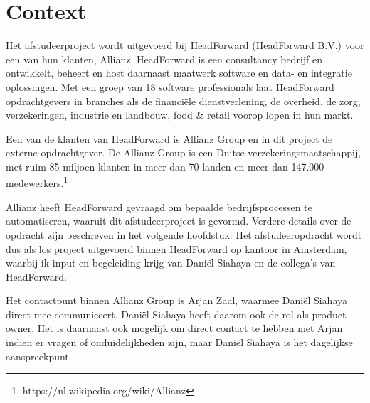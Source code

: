 \chapter{Context}\label{chap:context}
Het afstudeerproject wordt uitgevoerd bij HeadForward (HeadForward B.V.) voor een van hun klanten, Allianz. HeadForward is een consultancy bedrijf en ontwikkelt, beheert en host daarnaast maatwerk software en data- en integratie oplossingen. Met een groep van 18 software professionals laat HeadForward opdrachtgevers in branches als de financiële dienstverlening, de overheid, de zorg, verzekeringen, industrie en landbouw, food \& retail voorop lopen in hun markt.\par

Een van de klanten van HeadForward is Allianz Group en in dit project de externe opdrachtgever. De Allianz Group is een Duitse verzekeringsmaatschappij, met ruim 85 miljoen klanten in meer dan 70 landen en meer dan 147.000 medewerkers.\footnote{https://nl.wikipedia.org/wiki/Allianz} \par

Allianz heeft HeadForward gevraagd om bepaalde bedrijfsprocessen te automatiseren, waaruit dit afstudeerproject is gevormd. Verdere details over de opdracht zijn beschreven in het volgende hoofdstuk. Het afstudeeropdracht wordt dus als los project uitgevoerd binnen HeadForward op kantoor in Amsterdam, waarbij ik input en begeleiding krijg van Dani\"el Siahaya en de collega's van HeadForward.\par

Het contactpunt binnen Allianz Group is Arjan Zaal, waarmee Dani\"el Siahaya direct mee communiceert. Dani\"el Siahaya heeft daarom ook de rol als product owner. Het is daarnaast ook mogelijk om direct contact te hebben met Arjan indien er vragen of onduidelijkheden zijn, maar Dani\"el Siahaya is het dagelijkse aanspreekpunt.\par